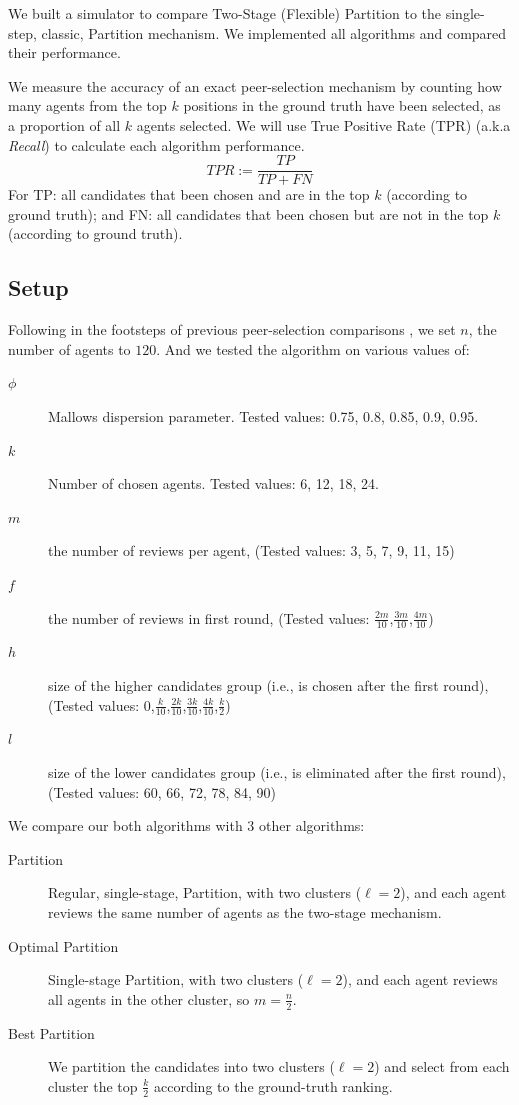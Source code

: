 \documentclass[letterpaper]{article}
\begin{document}
We built a simulator to compare Two-Stage (Flexible) Partition to the single-step, classic, Partition mechanism. We implemented all algorithms and compared their performance.

We measure the accuracy of an exact peer-selection mechanism by counting how many agents from the top $k$ positions in the ground truth have been selected, as a proportion of all $k$ agents selected. We will use True Positive Rate (TPR) (a.k.a \emph{Recall}) to calculate each algorithm performance.
\small
$$
 TPR := \frac{TP}{TP + FN}
$$
\normalsize
For TP: all candidates that been chosen and are in the top $k$ (according to ground truth); and
FN: all candidates that been chosen but are not in the top $k$ (according to ground truth).

\subsection{Setup}
Following in the footsteps of previous peer-selection comparisons \cite{ALMRW19,LMTZ23}, we set $n$, the number of agents to $120$. And we tested the algorithm on various values of:
\begin{description}
\item [$\phi$] Mallows dispersion parameter. Tested values: 0.75, 0.8, 0.85, 0.9, 0.95.
\item [$k$] Number of chosen agents. Tested values: 6, 12, 18, 24.
\item [$m$] the number of reviews per agent, (Tested values: 3, 5, 7, 9, 11, 15)
\item [$f$] the number of reviews in first round, (Tested values: $\frac{2m}{10}$,$\frac{3m}{10}$,$\frac{4m}{10}$)
\item [$h$] size of the higher candidates group (i.e., is chosen after the first round), (Tested values: $0$,$\frac{k}{10}$,$\frac{2k}{10}$,$\frac{3k}{10}$,$\frac{4k}{10}$,$\frac{k}{2}$)
\item [$l$] size of the lower candidates group (i.e., is eliminated after the first round), (Tested values: 60, 66, 72, 78, 84, 90)
\end{description}
We compare our both algorithms with 3 other algorithms:
\begin{description}
\item [Partition] Regular, single-stage, Partition, with two clusters ($\ell=2$), and each agent reviews the same number of agents as the two-stage mechanism.
\item [Optimal Partition] Single-stage Partition, with two clusters ($\ell=2$), and each agent reviews all agents in the other cluster, so $m=\frac{n}{2}$.
\item [Best Partition] We partition the candidates into two clusters ($\ell=2$) and select from each cluster the top $\frac{k}{2}$ according to the ground-truth ranking.
\end{description}
\end{document}
